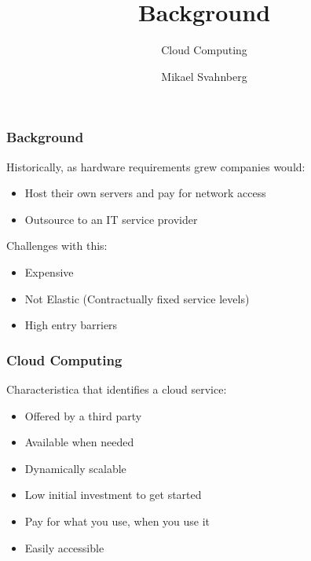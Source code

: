 \documentclass[10pt]{beamer}
\title[]{Background}
\subtitle{Cloud Computing}
\author[Mikael Svahnberg]{Mikael Svahnberg\inst{1}}
\institute[BTH] %
{
  \inst{1}%
 Mikael.Svahnberg@bth.se\\
 School of Computing\\
 Blekinge Institute of Technology%
}
\begin{document}
\begin{frame}
  \titlepage
\end{frame}





\begin{frame}[t]
\frametitle{Background}
Historically, as hardware requirements grew companies would:
\begin{itemize}
\item Host their own servers and pay for network access
\item Outsource to an IT service provider
\end{itemize}

Challenges with this:
\begin{itemize}
\item Expensive
\item Not Elastic (Contractually fixed service levels)
\item High entry barriers
\end{itemize}
\end{frame}


\begin{frame}[t]
\frametitle{Cloud Computing}
Characteristica that identifies a cloud service:
\begin{itemize}
\item Offered by a third party
\item Available when needed
\item Dynamically scalable
\item Low initial investment to get started
\item Pay for what you use, when you use it
\item Easily accessible
\end{itemize}
\end{frame}
\end{document}
